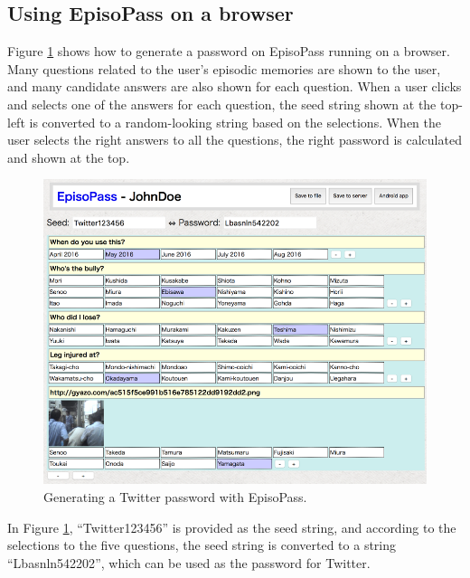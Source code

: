 \documentclass{sigchi}
\begin{document}
\subsection{Using EpisoPass on a browser}

Figure \ref{web1} shows how to generate a password
on EpisoPass running on a browser.
Many questions related to the user's episodic memories are shown to the user,
and many candidate answers are also shown for each question.
When a user clicks and selects one of the answers for each question,
the seed string shown at the top-left is converted to a random-looking string
based on the selections.
When the user selects the right answers to all the questions,
the right password is calculated and shown at the top.


\begin{figure}[t]
\centering
\includegraphics[width=1.0\columnwidth]{figures/c1bd6e7f67698c70978f528ccd2339d9}
\caption{Generating a Twitter password with EpisoPass.}
\label{web1}
\end{figure}

In Figure \ref{web1},
``\textsf{Twitter123456}'' is provided as the seed string,
and according to the selections to the five questions,
the seed string is converted to a string
``\textsf{Lbasnln542202}'',
which can be used as the password for Twitter.
\end{document}

